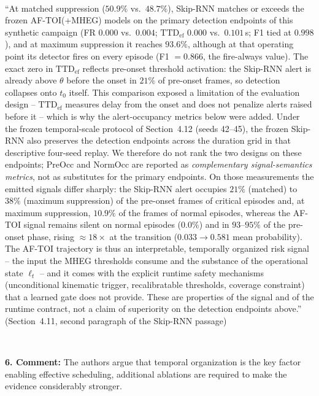 \documentclass[1p,12pt,authoryear]{elsarticle}
\begin{document}
~

``At matched suppression ($50.9\%$ vs.\ $48.7\%$), Skip-RNN matches or exceeds the frozen AF-TOI(+MHEG) models on the primary detection endpoints of this synthetic campaign (FR $0.000$ vs.\ $0.004$; $\mathrm{TTD}_{\mathrm{ef}}$ $0.000$ vs.\ $0.101$\,s; F1 tied at $0.998$), and at maximum suppression it reaches $93.6\%$, although at that operating point its detector fires on every episode (F1 $=0.866$, the fire-always value). The exact zero in $\mathrm{TTD}_{\mathrm{ef}}$ reflects pre-onset threshold activation: the Skip-RNN alert is already above $\theta$ before the onset in $21\%$ of pre-onset frames, so detection collapses onto $t_0$ itself. This comparison exposed a limitation of the evaluation design -- $\mathrm{TTD}_{\mathrm{ef}}$ measures delay from the onset and does not penalize alerts raised before it -- which is why the alert-occupancy metrics below were added. Under the frozen temporal-scale protocol of Section~4.12 (seeds 42--45), the frozen Skip-RNN also preserves the detection endpoints across the duration grid in that descriptive four-seed replay. We therefore do not rank the two designs on these endpoints; PreOcc and NormOcc are reported as \emph{complementary signal-semantics metrics}, not as substitutes for the primary endpoints. On those measurements the emitted signals differ sharply: the Skip-RNN alert occupies $21\%$ (matched) to $38\%$ (maximum suppression) of the pre-onset frames of critical episodes and, at maximum suppression, $10.9\%$ of the frames of normal episodes, whereas the AF-TOI signal remains silent on normal episodes ($0.0\%$) and in $93$--$95\%$ of the pre-onset phase, rising ${\approx}18\times$ at the transition ($0.033 \rightarrow 0.581$ mean probability). The AF-TOI trajectory is thus an interpretable, temporally organized risk signal -- the input the MHEG thresholds consume and the substance of the operational state $\ell_t$ -- and it comes with the explicit runtime safety mechanisms (unconditional kinematic trigger, recalibratable thresholds, coverage constraint) that a learned gate does not provide. These are properties of the signal and of the runtime contract, not a claim of superiority on the detection endpoints above.'' (Section~4.11, second paragraph of the Skip-RNN passage)

~

\noindent \textbf{6. Comment:} The authors argue that temporal organization is the key factor enabling effective scheduling, additional ablations are required to make the evidence considerably stronger.
\end{document}
